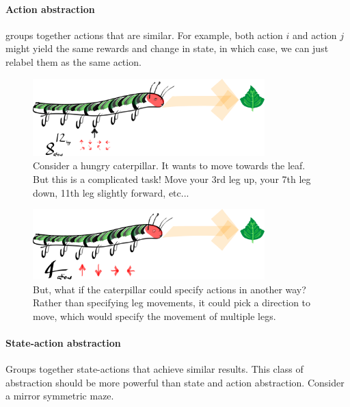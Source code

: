\paragraph{Action abstraction}

groups together actions that are similar. For
example, both action $i$ and action $j$ might yield the same rewards and change in state,
in which case, we can just relabel them as the same action.

\begin{figure}[h!]
\centering
\includegraphics[width=0.8\textwidth,height=0.2\textheight]{../../pictures/drawings/hungry-caterpillar.png}
\caption{Consider a hungry caterpillar. It wants to move towards the leaf. But this is a complicated task! Move your 3rd leg up, your 7th leg down, 11th leg slightly forward, etc...}
\end{figure}


\begin{figure}[h!]
\centering
\includegraphics[width=0.8\textwidth,height=0.2\textheight]{../../pictures/drawings/full-caterpillar.png}
\caption{But, what if the caterpillar could specify actions in another way?
Rather than specifying leg movements, it could pick a direction to move,
which would specify the movement of multiple legs.}
\end{figure}

\paragraph{State-action abstraction}

Groups together state-actions that achieve similar results. This class of abstraction
should be more powerful than state and action abstraction. Consider a mirror symmetric maze.

